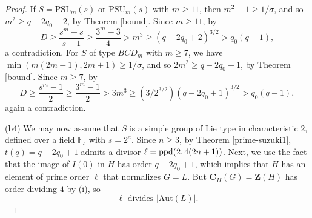 \documentclass[11pt]{amsart}
\theoremstyle{plain}
\theoremstyle{definition}
\numberwithin{thm}{section}
\numberwithin{equation}{thm}
\newcommand{\Aut}{\mathrm{Aut}}
\newcommand{\SL}{\mathrm{SL}}
\newcommand{\PSL}{\mathrm{PSL}}
\newcommand{\SU}{\mathrm{SU}}
\newcommand{\PSU}{\mathrm{PSU}}
\newcommand{\PSp}{\mathrm{PSp}}
\newcommand{\F}{{\mathbb F}}
\newcommand{\0}{\emptyset}
\newcommand{\ppd}{{\rm ppd}}
\newcommand{\ZB}{{\mathbf Z}}
\newcommand{\CB}{{\mathbf C}}
\newcommand{\meo}{\mathsf{meo}}
\newcommand{\dl}{\mathfrak{d}}
\begin{document}
\begin{proof}
If $S = \PSL_m(s)$ or $\PSU_m(s)$ with $m \geq 11$, then 
$m^2-1 \geq 1/\sigma$, and so $m^2 \geq q-2q_0+2$, by Theorem \ref{bound}. Since $m \geq 11$, by \cite[Theorem 1.1]{TZ} 
$$D \geq \frac{s^m-s}{s+1} \geq \frac{3^m-3}{4} > m^3 \geq (q-2q_0+2)^{3/2} > q_0(q-1),$$
a contradiction. For $S$ of type $BCD_m$ with $m \geq 7$, we have 
$\min(m(2m-1),2m+1) \geq 1/\sigma$, and so $2m^2 \geq q-2q_0+1$, by Theorem \ref{bound}. Since $m \geq 7$, by 
\cite[Theorem 1.1]{TZ}  %
$$D \geq \frac{s^m-1}{2} \geq \frac{3^m-1}{2} > 3m^3 \geq (3/2^{3/2})(q-2q_0+1)^{3/2} > q_0(q-1),$$
again a contradiction.

\smallskip
(b4) We may now assume that $S$ is a simple group of Lie type in characteristic $2$, defined over a field $\F_s$ with $s=2^a$. 
Since $n \geq 3$, by Theorem \ref{prime-suzuki1}, $t(q)=q-2q_0+1$ admits a divisor $\ell = \ppd(2,4(2n+1))$. 
Next, we use the fact that the image of $I(0)$ in $H$ has order $q-2q_0+1$, which implies that $H$ has an element 
of prime order $\ell$ that normalizes $G=L$. But $\CB_H(G) = \ZB(H)$ has order dividing $4$ by (i), so 
\begin{equation}\label{div10}
  \ell \mbox{ divides } |\Aut(L)|.
\end{equation}   
 

\end{proof}
\end{document}
